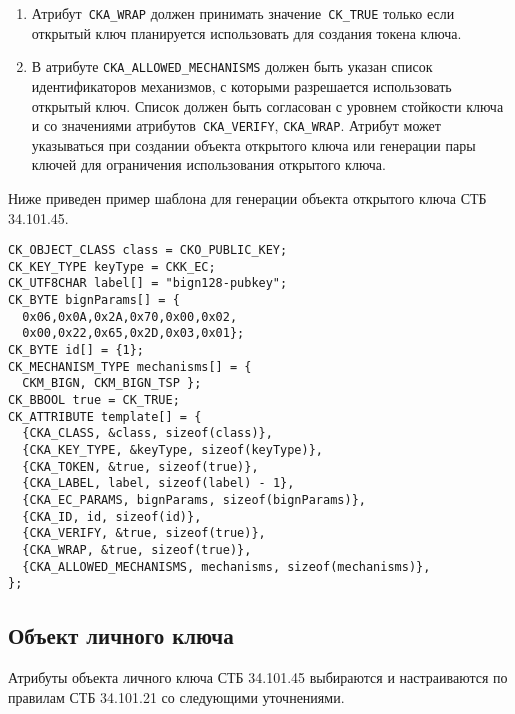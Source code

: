 \begin{enumerate}
\item
Атрибут~\verb|CKA_WRAP| должен принимать значение~\verb|CK_TRUE|
только если открытый ключ планируется использовать для создания
токена ключа.

\item
В атрибуте \verb|CKA_ALLOWED_MECHANISMS| должен быть указан список 
идентификаторов механизмов, с которыми разрешается использовать открытый 
ключ. Список должен быть согласован с уровнем стойкости ключа и со 
значениями атрибутов~\verb|CKA_VERIFY|, \verb|CKA_WRAP|. 
%
Атрибут может указываться при создании объекта открытого ключа или 
генерации пары ключей для ограничения использования открытого ключа.
\end{enumerate}
 
Ниже приведен пример шаблона для генерации объекта открытого ключа СТБ 
34.101.45.

\begin{verbatim}
CK_OBJECT_CLASS class = CKO_PUBLIC_KEY;
CK_KEY_TYPE keyType = CKK_EC;
CK_UTF8CHAR label[] = "bign128-pubkey";
CK_BYTE bignParams[] = {
  0x06,0x0A,0x2A,0x70,0x00,0x02,
  0x00,0x22,0x65,0x2D,0x03,0x01};
CK_BYTE id[] = {1};
CK_MECHANISM_TYPE mechanisms[] = {
  CKM_BIGN, CKM_BIGN_TSP };
CK_BBOOL true = CK_TRUE;
CK_ATTRIBUTE template[] = {
  {CKA_CLASS, &class, sizeof(class)},
  {CKA_KEY_TYPE, &keyType, sizeof(keyType)},
  {CKA_TOKEN, &true, sizeof(true)},
  {CKA_LABEL, label, sizeof(label) - 1},
  {CKA_EC_PARAMS, bignParams, sizeof(bignParams)},
  {CKA_ID, id, sizeof(id)},
  {CKA_VERIFY, &true, sizeof(true)},
  {CKA_WRAP, &true, sizeof(true)},
  {CKA_ALLOWED_MECHANISMS, mechanisms, sizeof(mechanisms)},
};
\end{verbatim}

\subsection{Объект личного ключа}\label{CRYPTOKI.Privkey}


Атрибуты объекта личного ключа СТБ 34.101.45 
выбираются и настраиваются по правилам СТБ 34.101.21 со 
следующими уточнениями.

